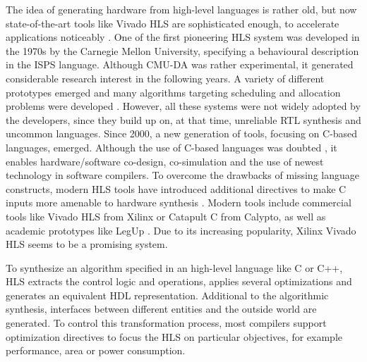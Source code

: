 The idea of generating hardware from high-level languages is rather old, but
now state-of-the-art tools like Vivado HLS are sophisticated enough, to
accelerate applications noticeably \citep{EcEc08,XSA10}. One of the first
pioneering \ac{HLS} system was developed in the 1970s \citep{DPS81} by the
Carnegie Mellon University, specifying a behavioural description in the
\ac{ISPS} language. Although \ac{CMU-DA} was rather experimental, it generated
considerable research interest in the following years. A variety of different
prototypes emerged and many algorithms targeting scheduling and allocation
problems were developed \citep{CBN11}. However, all these systems were not
widely adopted by the developers, since they build up on, at that time,
unreliable \ac{RTL} synthesis and uncommon languages. Since 2000, a new
generation of tools, focusing on C-based languages, emerged. Although the use
of C-based languages was doubted \citep{Edw06}, it enables hardware/software
co-design, co-simulation and the use of newest technology in software
compilers. To overcome the drawbacks of missing language constructs, modern
\ac{HLS} tools have introduced additional directives to make C inputs more
amenable to hardware synthesis \citep{CBN11}. Modern tools include commercial
tools like Vivado HLS from Xilinx or Catapult C from Calypto, as well as
academic prototypes like LegUp \citep{CCA11}. Due to its increasing
popularity, Xilinx Vivado HLS seems to be a promising system.

To synthesize an algorithm specified in an high-level language like C or C++,
\ac{HLS} extracts the control logic and operations, applies several
optimizations and generates an equivalent \ac{HDL} representation. Additional
to the algorithmic synthesis, interfaces between different entities and the
outside world are generated. To control this transformation process, most
compilers support optimization directives to focus the \ac{HLS} on particular
objectives, for example performance, area or power consumption.

